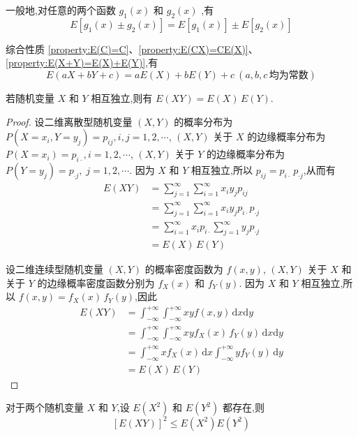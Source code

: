 一般地,对任意的两个函数 $g_1(x)$ 和 $g_2(x)$ ,有
$$
E[g_1(x) \pm g_2(x)] = E[g_1(x)] \pm E[g_2(x)]
$$

综合性质 \ref{property:E(C)=C}、\ref{property:E(CX)=CE(X)}、\ref{property:E(X+Y)=E(X)+E(Y)},有
$$
E(aX+bY+c) = aE(X) + bE(Y) + c \ (a,b,c \, \text{均为常数})
$$

\begin{property}[][][prop:E(XY)=E(X)E(Y)]
    \indent 若随机变量 $X$ 和 $Y$ 相互独立,则有 $E(XY)=E(X) \, E(Y)$.
\end{property}

\begin{proof}
    设二维离散型随机变量 $(X,Y)$ 的概率分布为 $P(X=x_i,Y=y_j) = p_{ij}, i,j=1,2,\cdots$, $(X,Y)$ 关于 $X$ 的边缘概率分布为 $P(X=x_i)=p_{i\cdot}, i=1,2,\cdots$, $(X,Y)$ 关于 $Y$ 的边缘概率分布为 $P(Y=y_j)=p_{\cdot j}, \; j=1,2,\cdots$. 因为 $X$ 和 $Y$ 相互独立,所以 $p_{ij} = p_{i\cdot} \, p_{\cdot j}$,从而有
    $$
    \begin{aligned}
        E(XY) &= \sum_{j=1}^{\infty} \sum_{i=1}^{\infty} x_i y_j p_{ij} \\
        &= \sum_{j=1}^{\infty} \sum_{i=1}^{\infty} x_i y_j p_{i\cdot} p_{\cdot j} \\
        &= \sum_{i=1}^{\infty} x_i p_{i\cdot} \sum_{j=1}^{\infty} y_j p_{\cdot j} \\
        &= E(X) \, E(Y)
    \end{aligned}
    $$

    设二维连续型随机变量 $(X,Y)$ 的概率密度函数为 $f(x,y)$, $(X,Y)$ 关于 $X$ 和关于 $Y$ 的边缘概率密度函数分别为 $f_X(x)$ 和 $f_Y(y)$. 因为 $X$ 和 $Y$ 相互独立,所以 $f(x,y) = f_X(x) \, f_Y(y)$,因此
    $$
    \begin{aligned}
        E(XY) &= \int_{-\infty}^{+\infty} \int_{-\infty}^{+\infty} xy f(x,y) \, \text{d}x \text{d}y \\
        &= \int_{-\infty}^{+\infty} \int_{-\infty}^{+\infty} xy f_X(x) \, f_Y(y) \, \text{d}x \text{d}y \\
        &= \int_{-\infty}^{+\infty} x f_X(x) \, \text{d}x \int_{-\infty}^{+\infty} y f_Y(y) \, \text{d}y \\
        &= E(X) \, E(Y)
    \end{aligned}
    $$
\end{proof}

\begin{property}
    \indent 对于两个随机变量 $X$ 和 $Y$,设 $E(X^2)$ 和 $E(Y^2)$ 都存在,则
    \begin{equation} \label{equation:柯西-施瓦茨不等式}
        [E(XY)]^2 \leqslant E(X^2) E(Y^2)
    \end{equation}
\end{property}

